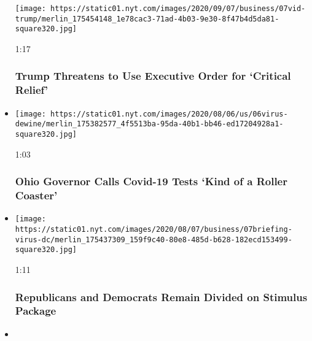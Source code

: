 \begin{itemize}
  \texttt{[image: https://static01.nyt.com/images/2020/09/07/business/07vid-trump/merlin\_175454148\_1e78cac3-71ad-4b03-9e30-8f47b4d5da81-square320.jpg]}

  1:17

  \hypertarget{trump-threatens-to-use-executive-order-for-critical-relief}{%
  \subsubsection{Trump Threatens to Use Executive Order for `Critical
  Relief'}\label{trump-threatens-to-use-executive-order-for-critical-relief}}
\item
  \href{https://www.nytimes.com/video/us/politics/100000007279160/coronavirus-ohio-governor.html?action=click\&module=video-series-bar\&region=header\&pgtype=Article\&playlistId=video/latest-video}{}

  \texttt{[image: https://static01.nyt.com/images/2020/08/06/us/06virus-dewine/merlin\_175382577\_4f5513ba-95da-40b1-bb46-ed17204928a1-square320.jpg]}

  1:03

  \hypertarget{ohio-governor-calls-covid-19-tests-kind-of-a-roller-coaster}{%
  \subsubsection{Ohio Governor Calls Covid-19 Tests `Kind of a Roller
  Coaster'}\label{ohio-governor-calls-covid-19-tests-kind-of-a-roller-coaster}}
\item
  \href{https://www.nytimes.com/video/us/100000007279221/republicans-democrats-divided-over-stimulus.html?action=click\&module=video-series-bar\&region=header\&pgtype=Article\&playlistId=video/latest-video}{}

  \texttt{[image: https://static01.nyt.com/images/2020/08/07/business/07briefing-virus-dc/merlin\_175437309\_159f9c40-80e8-485d-b628-182ecd153499-square320.jpg]}

  1:11

  \hypertarget{republicans-and-democrats-remain-divided-on-stimulus-package}{%
  \subsubsection{Republicans and Democrats Remain Divided on Stimulus
  Package}\label{republicans-and-democrats-remain-divided-on-stimulus-package}}
\item
  \href{https://www.nytimes.com/video/world/100000007278318/air-india-plane-crash-video.html?action=click\&module=video-series-bar\&region=header\&pgtype=Article\&playlistId=video/latest-video}{}


\end{itemize}
